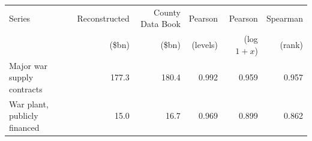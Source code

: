\begin{tabular}{lrrrrr}
\toprule
Series & Reconstructed & County Data Book & Pearson & Pearson & Spearman \\
 & (\$bn) & (\$bn) & (levels) & (log$1{+}x$) & (rank) \\
\midrule
Major war supply contracts & 177.3 & 180.4 & 0.992 & 0.959 & 0.957 \\
War plant, publicly financed & 15.0 & 16.7 & 0.969 & 0.899 & 0.862 \\
\bottomrule
\end{tabular}